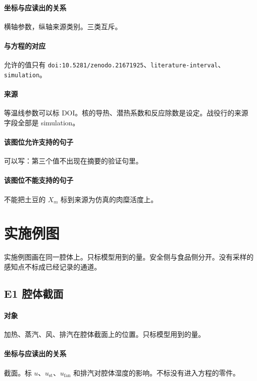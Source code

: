 \paragraph{坐标与应读出的关系}
横轴参数，纵轴来源类别。三类互斥。

\paragraph{与方程的对应}
允许的值只有 \texttt{doi:10.5281/zenodo.21671925}、\texttt{literature-interval}、\texttt{simulation}。

\paragraph{来源}
等温线参数可以标 DOI。核的导热、潜热系数和反应除数是设定。战役行的来源字段全部是 simulation。

\paragraph{该图位允许支持的句子}
可以写：第三个值不出现在摘要的验证句里。

\paragraph{该图位不能支持的句子}
不能把土豆的 $X_m$ 标到来源为仿真的肉糜活度上。

\section{实施例图}

实施例图画在同一腔体上。只标模型用到的量。安全侧与食品侧分开。没有采样的感知点不标成已经记录的通道。

\subsection{E1 腔体截面}
\paragraph{对象}
加热、蒸汽、风、排汽在腔体截面上的位置。只标模型用到的量。

\paragraph{坐标与应读出的关系}
截面。标 $u$、$u_{\mathrm{st}}$、$u_{\mathrm{fan}}$ 和排汽对腔体湿度的影响。不标没有进入方程的零件。

